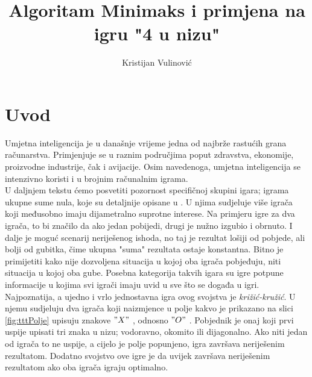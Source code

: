\documentclass[times, utf8, seminar, numeric, tikz]{fer}
\begin{document}

\nocite{*}

\title{Algoritam Minimaks i primjena na igru "4 u nizu"}

\author{Kristijan Vulinović}


	\maketitle


\tableofcontents

\chapter{Uvod}

Umjetna inteligencija je u današnje vrijeme jedna od najbrže rastućih grana računarstva. Primjenjuje se u raznim područjima poput zdravstva, ekonomije, proizvodne industrije, čak i avijacije. Osim navedenoga, umjetna inteligencija se intenzivno koristi i u brojnim računalnim igrama.\\

U daljnjem tekstu ćemo posvetiti pozornost specifičnoj skupini igara; igrama ukupne sume nula, koje su detaljnije opisane u \cite{5205101}. U njima sudjeluje više igrača koji međusobno imaju dijametralno suprotne interese. Na primjeru igre za dva igrača, to bi značilo da ako jedan pobijedi, drugi je nužno izgubio i obrnuto. I dalje je moguć scenarij neriješenog ishoda, no taj je rezultat lošiji od pobjede, ali bolji od gubitka, čime ukupna "suma" rezultata ostaje konstantna. Bitno je primijetiti kako nije dozvoljena situacija u kojoj oba igrača pobjeđuju, niti situacija u kojoj oba gube. Posebna kategorija takvih igara su igre potpune informacije u kojima svi igrači imaju uvid u sve što se događa u igri.\\

Najpoznatija, a ujedno i vrlo jednostavna igra ovog svojstva je \textit{križić-kružić}. U njemu sudjeluju dva igrača koji naizmjence u polje kakvo je prikazano na slici \ref{fig:tttPolje} upisuju znakove \textit{$"X"$ }, odnosno \textit{$"O"$ }. Pobjednik je onaj koji prvi uspije upisati tri znaka u nizu; vodoravno, okomito ili dijagonalno. Ako niti jedan od igrača to ne uspije, a cijelo je polje popunjeno, igra završava neriješenim rezultatom. Dodatno svojstvo ove igre je da uvijek završava neriješenim rezultatom ako oba igrača igraju optimalno.\\
\end{document}
